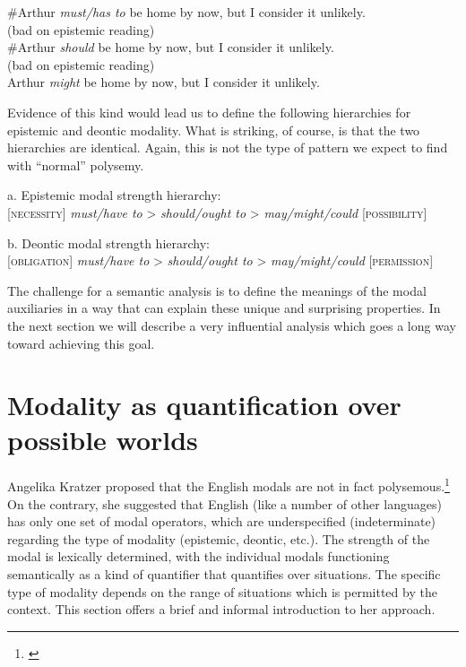 \ea
\ea \#Arthur \textit{must/has to} be home by now, but I consider it unlikely.\\
  (bad on epistemic reading)\\
\ex \#Arthur \textit{should} be home by now, but I consider it unlikely.\\
  (bad on epistemic reading)\\
\ex Arthur \textit{might} be home by now, but I consider it unlikely.
                       \z
\z


Evidence of this kind would lead us to define the following hierarchies for epistemic and deontic modality. What is striking, of course, is that the two hierarchies are identical. Again, this is not the type of pattern we expect to find with “normal” polysemy.


\ea






 a.  Epistemic modal strength hierarchy:\\
{}[\textsc{necessity}]  \textit{must/have to} > \textit{should/ought to} > \textit{may/might/could}  [\textsc{possibility}]
\z

\ea
  b.  Deontic modal strength hierarchy:\\
{}[\textsc{obligation}]  \textit{must/have to} > \textit{should/ought to} > \textit{may/might/could}  [\textsc{permission}]
\z


The challenge for a semantic analysis is to define the meanings of the modal auxiliaries in a way that can explain these unique and surprising properties. In the next section we will describe a very influential analysis which goes a long way toward achieving this goal.


\section{Modality as quantification over possible worlds}\label{sec:} %

Angelika Kratzer proposed that the English modals are not in fact polysemous.\footnote{\citet{Kratzer1981,Kratzer1991}} On the contrary, she suggested that English (like a number of other languages) has only one set of modal operators, which are underspecified (indeterminate) regarding the type of modality (epistemic, deontic, etc.). The strength of the modal is lexically determined, with the individual modals functioning semantically as a kind of quantifier that quantifies over situations. The specific type of modality depends on the range of situations which is permitted by the context. This section offers a brief and informal introduction to her approach.



